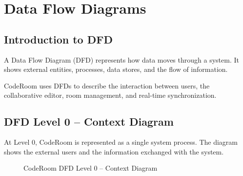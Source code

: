 \documentclass[12pt,a4paper,oneside]{report}
\begin{document}
\chapter{Data Flow Diagrams}

\section{Introduction to DFD}

A Data Flow Diagram (DFD) represents how data moves through a system. It shows external entities, processes, data stores, and the flow of information.

CodeRoom uses DFDs to describe the interaction between users, the collaborative editor, room management, and real-time synchronization.

\section{DFD Level 0 -- Context Diagram}

At Level 0, CodeRoom is represented as a single system process. The diagram shows the external users and the information exchanged with the system.

\begin{figure}[H]
\centering


\caption{CodeRoom DFD Level 0 -- Context Diagram}
\label{fig:dfd0}

\end{figure}
\end{document}
